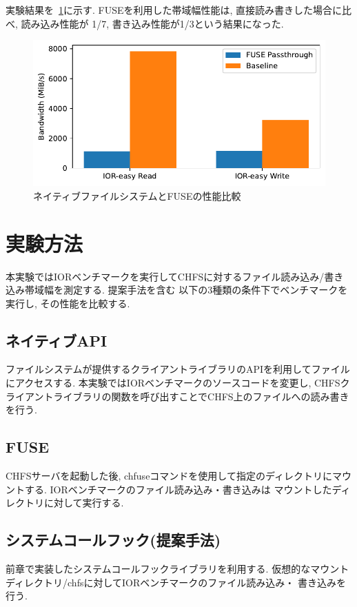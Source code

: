 \documentclass[a4paper,11pt]{jreport}
\begin{document}
実験結果を\figurename~\ref{fig:FUSE Performance}に示す. FUSEを利用した帯域幅性能は, 直接読み書きした場合に比べ, 読み込み性能が
1/7, 書き込み性能が1/3という結果になった. 

\newpage

\begin{figure}[h]
	\begin{minipage}[b]{1\columnwidth}
		\centering
		\includegraphics[width=0.9\linewidth]{./figure/fuse_overhead.ssd.pdf}
		\caption{ネイティブファイルシステムとFUSEの性能比較}
		\label{fig:FUSE Performance}
	\end{minipage}
\end{figure}
\section{実験方法}
本実験ではIORベンチマークを実行してCHFSに対するファイル読み込み/書き込み帯域幅を測定する. 提案手法を含む
以下の3種類の条件下でベンチマークを実行し, その性能を比較する. 

\subsection{ネイティブAPI}
ファイルシステムが提供するクライアントライブラリのAPIを利用してファイルにアクセスする. 本実験ではIORベンチマークのソースコードを変更し, 
CHFSクライアントライブラリの関数を呼び出すことでCHFS上のファイルへの読み書きを行う. 
\subsection{FUSE}
CHFSサーバを起動した後, chfuseコマンドを使用して指定のディレクトリにマウントする. IORベンチマークのファイル読み込み・書き込みは
マウントしたディレクトリに対して実行する. 
\subsection{システムコールフック(提案手法)}
前章で実装したシステムコールフックライブラリを利用する. 仮想的なマウントディレクトリ/chfsに対してIORベンチマークのファイル読み込み・
書き込みを行う. 
\end{document}
